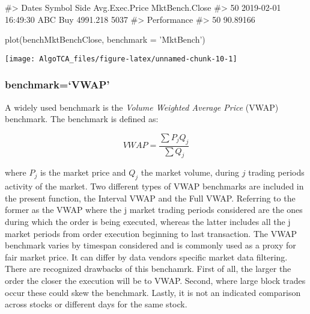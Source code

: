 \begin{Schunk}
\begin{Soutput}
#>                  Dates Symbol Side Avg.Exec.Price MktBench.Close
#> 50 2019-02-01 16:49:30    ABC  Buy       4991.218           5037
#>    Performance
#> 50    90.89166
\end{Soutput}
\begin{Sinput}
plot(benchMktBenchClose, benchmark = 'MktBench')
\end{Sinput}

\texttt{[image: AlgoTCA\_files/figure-latex/unnamed-chunk-10-1]} \end{Schunk}

\hypertarget{benchmarkvwap}{%
\subsubsection{benchmark=`VWAP'}\label{benchmarkvwap}}

A widely used benchmark is the \emph{Volume Weighted Average Price}
(VWAP) benchmark. The benchmark is defined as:

\[ VWAP = \frac{\sum {P_{j}Q_{j}}}{\sum {Q_{j}}} \]

where \(P_{j}\) is the market price and \(Q_{j}\) the market volume,
during \(j\) trading periods activity of the market. Two different types
of VWAP benchmarks are included in the present function, the Interval
VWAP and the Full VWAP. Referring to the former as the VWAP where the j
market trading periods considered are the ones during which the order is
being executed, whereas the latter includes all the j market periods
from order execution beginning to last transaction. The VWAP benchmark
varies by timespan considered and is commonly used as a proxy for fair
market price. It can differ by data vendors specific market data
filtering. There are recognized drawbacks of this benchamrk. First of
all, the larger the order the closer the execution will be to VWAP.
Second, where large block trades occur these could skew the benchmark.
Lastly, it is not an indicated comparison across stocks or different
days for the same stock.

